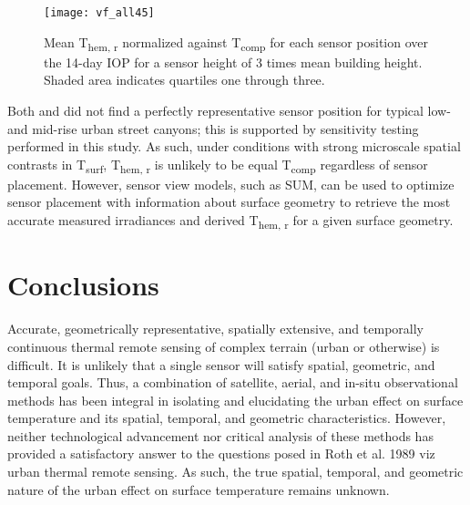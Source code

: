   \begin{figure}[H]
	\centering
	\texttt{[image: vf\_all45]}
	\caption{Mean T\textsubscript{hem, r} normalized against T\textsubscript{comp} for each sensor position over the 14-day IOP for a sensor height of 3 times mean building height. Shaded area indicates quartiles one through three.}
	\label{vf_all45}
\end{figure}
 
Both \citet{Roberts2010} and \citet{Adderley2015} did not find a perfectly representative sensor position for typical low- and mid-rise urban street canyons; this is supported by sensitivity testing performed in this study. As such, under conditions with strong microscale spatial contrasts in T\textsubscript{surf}, T\textsubscript{hem, r} is unlikely to be equal T\textsubscript{comp} regardless of sensor placement. However, sensor view models, such as SUM, can be used to optimize sensor placement with information about surface geometry to retrieve the most accurate measured irradiances and derived T\textsubscript{hem, r} for a given surface geometry.
 
 \section{Conclusions}
 
Accurate, geometrically representative, spatially extensive, and temporally continuous thermal remote sensing of complex terrain (urban or otherwise) is difficult. It is unlikely that a single sensor will satisfy spatial, geometric, and temporal goals. Thus, a combination of satellite, aerial, and in-situ observational methods has been integral in isolating and elucidating the urban effect on surface temperature and its spatial, temporal, and geometric characteristics. However, neither technological advancement nor critical analysis of these methods has provided a satisfactory answer to the questions posed in Roth et al. 1989 viz urban thermal remote sensing. As such, the true spatial, temporal, and geometric nature of the urban effect on surface temperature remains unknown. 
 
